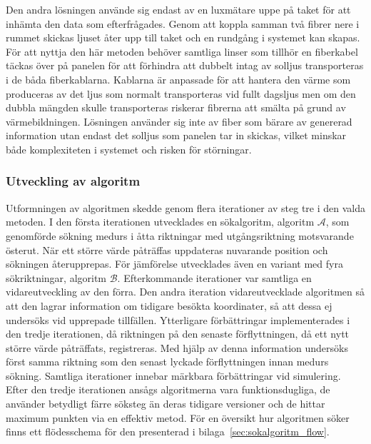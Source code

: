             Den andra lösningen använde sig endast av en luxmätare uppe på taket för att inhämta den data som efterfrågades. Genom att koppla samman två fibrer nere i rummet skickas ljuset åter upp till taket och en rundgång i systemet kan skapas. För att nyttja den här metoden behöver samtliga linser som tillhör en fiberkabel täckas över på panelen för att förhindra att dubbelt intag av solljus transporteras i de båda fiberkablarna. Kablarna är anpassade för att hantera den värme som produceras av det ljus som normalt transporteras vid fullt dagsljus men om den dubbla mängden skulle transporteras riskerar fibrerna att smälta på grund av värmebildningen. Lösningen använder sig inte av fiber som bärare av genererad information utan endast det solljus som panelen tar in skickas, vilket minskar både komplexiteten i systemet och risken för störningar.

        \subsubsection{Utveckling av algoritm} %
        \label{ssub:utveckling_av_algoritm}
            Utformningen av algoritmen skedde genom flera iterationer av steg tre i den valda metoden. I den första iterationen utvecklades en sökalgoritm, algoritm $\mathscr{A}$, som genomförde sökning medurs i åtta riktningar med utgångsriktning motsvarande österut. När ett större värde påträffas uppdateras nuvarande position och sökningen återupprepas. För jämförelse utvecklades även en variant med fyra sökriktningar, algoritm $\mathscr{B}$. Efterkommande iterationer var samtliga en vidareutveckling av den förra. Den andra iteration vidareutvecklade algoritmen så att den lagrar information om tidigare besökta koordinater, så att dessa ej undersöks vid upprepade tillfällen. Ytterligare förbättringar implementerades i den tredje iterationen, då riktningen på den senaste förflyttningen, då ett nytt större värde påträffats, registreras. Med hjälp av denna information undersöks först samma riktning som den senast lyckade förflyttningen innan medurs sökning. Samtliga  iterationer innebar märkbara förbättringar vid simulering. Efter den tredje iterationen ansågs algoritmerna vara funktionsdugliga, de använder betydligt färre söksteg än deras tidigare versioner och de hittar maximum punkten via en effektiv metod. För en översikt hur algoritmen söker finns ett flödesschema för den presenterad i bilaga~\ref{sec:sokalgoritm_flow}.\bigskip

